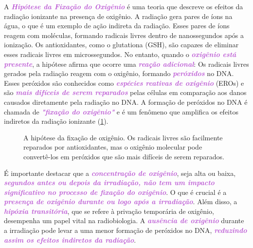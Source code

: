 \documentclass[11pt,a4paper]{article}
\newcounter{exemplo}
\begin{document}
	A \textcolor{MediumOrchid}{\textbf{\textit{Hipótese da Fixação do Oxigênio}}} é uma teoria que descreve os efeitos da radiação ionizante na presença de oxigênio. A radiação gera pares de íons na água, o que é um exemplo de ação indireta da radiação. Esses pares de íons reagem com moléculas, formando radicais livres dentro de nanossegundos após a ionização. Os antioxidantes, como o glutationa (GSH), são capazes de eliminar esses radicais livres em microssegundos. No entanto, quando o \textcolor{MediumOrchid}{\textbf{\textit{oxigênio está presente}}}, a hipótese afirma que ocorre uma \textcolor{MediumOrchid}{\textbf{\textit{reação adicional}}}: Os radicais livres gerados pela radiação reagem com o oxigênio, formando \textcolor{MediumOrchid}{\textbf{\textit{peróxidos}}} no DNA. Esses peróxidos são conhecidos como \textcolor{MediumOrchid}{\textbf{\textit{espécies reativas de oxigênio}}} (EROs) e são \textcolor{MediumOrchid}{\textbf{\textit{mais difíceis de serem reparados}}} pelas células em comparação aos danos causados diretamente pela radiação no DNA. A formação de peróxidos no DNA é chamada de \textcolor{MediumOrchid}{\textbf{\textit{"fixação do oxigênio"}}} e é um fenômeno que amplifica os efeitos indiretos da radiação ionizante (\ref{fig:hipoteseFixacaoOxigenio}).

	\begin{figure}[h]
		\centering
		\caption{A hipótese da fixação de oxigênio. Os radicais livres são facilmente reparados por antioxidantes, mas o oxigênio molecular pode convertê-los em peróxidos que são mais difíceis de serem reparados.}
		\label{fig:hipoteseFixacaoOxigenio}
	\end{figure}

	É importante destacar que a \textcolor{MediumOrchid}{\textbf{\textit{concentração de oxigênio}}}, seja alta ou baixa, \textcolor{MediumOrchid}{\textbf{\textit{segundos antes ou depois da irradiação, não tem um impacto significativo no processo de fixação do oxigênio}}}. O que é crucial é a \textcolor{MediumOrchid}{\textbf{\textit{presença de oxigênio durante ou logo após a irradiação}}}. Além disso, a \textcolor{MediumOrchid}{\textbf{\textit{hipóxia transitória}}}, que se refere à privação temporária de oxigênio, desempenha um papel vital na radiobiologia. A \textcolor{MediumOrchid}{\textbf{\textit{ausência de oxigênio}}} durante a irradiação pode levar a uma menor formação de peróxidos no DNA, \textcolor{MediumOrchid}{\textbf{\textit{reduzindo assim os efeitos indiretos da radiação}}}.
\end{document}
